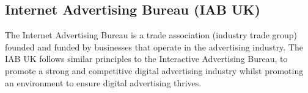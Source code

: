 \documentclass[12pt]{article}
\begin{document}
\subsection{ Internet Advertising Bureau (IAB UK)}
The Internet Advertising Bureau is a trade association (industry trade group) founded and funded by businesses that operate in the advertising industry. The IAB UK follows similar principles to the Interactive Advertising Bureau, to promote a strong and competitive digital advertising industry whilst promoting an environment to ensure digital advertising thrives. 

\medskip
\printbibliography
\end{document}
